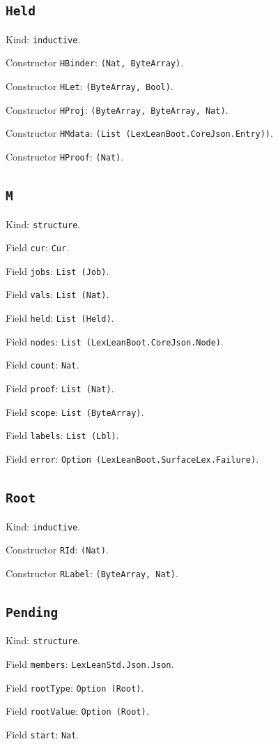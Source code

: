 \documentclass[11pt]{article}
\begin{document}
\subsection*{\texttt{Held}}
\noindent Kind: \texttt{inductive}.\par
\noindent Constructor \texttt{HBinder}: \texttt{(Nat, ByteArray)}.\par
\noindent Constructor \texttt{HLet}: \texttt{(ByteArray, Bool)}.\par
\noindent Constructor \texttt{HProj}: \texttt{(ByteArray, ByteArray, Nat)}.\par
\noindent Constructor \texttt{HMdata}: \texttt{(List (LexLeanBoot.CoreJson.Entry))}.\par
\noindent Constructor \texttt{HProof}: \texttt{(Nat)}.\par
\subsection*{\texttt{M}}
\noindent Kind: \texttt{structure}.\par
\noindent Field \texttt{cur}: \texttt{Cur}.\par
\noindent Field \texttt{jobs}: \texttt{List (Job)}.\par
\noindent Field \texttt{vals}: \texttt{List (Nat)}.\par
\noindent Field \texttt{held}: \texttt{List (Held)}.\par
\noindent Field \texttt{nodes}: \texttt{List (LexLeanBoot.CoreJson.Node)}.\par
\noindent Field \texttt{count}: \texttt{Nat}.\par
\noindent Field \texttt{proof}: \texttt{List (Nat)}.\par
\noindent Field \texttt{scope}: \texttt{List (ByteArray)}.\par
\noindent Field \texttt{labels}: \texttt{List (Lbl)}.\par
\noindent Field \texttt{error}: \texttt{Option (LexLeanBoot.SurfaceLex.Failure)}.\par
\subsection*{\texttt{Root}}
\noindent Kind: \texttt{inductive}.\par
\noindent Constructor \texttt{RId}: \texttt{(Nat)}.\par
\noindent Constructor \texttt{RLabel}: \texttt{(ByteArray, Nat)}.\par
\subsection*{\texttt{Pending}}
\noindent Kind: \texttt{structure}.\par
\noindent Field \texttt{members}: \texttt{LexLeanStd.Json.Json}.\par
\noindent Field \texttt{rootType}: \texttt{Option (Root)}.\par
\noindent Field \texttt{rootValue}: \texttt{Option (Root)}.\par
\noindent Field \texttt{start}: \texttt{Nat}.\par
\end{document}
